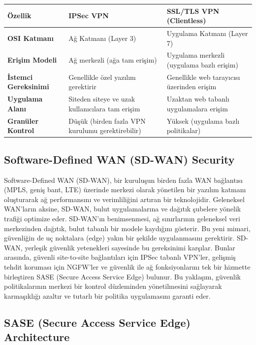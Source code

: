 \begin{tabular}{|p{4cm}|p{6cm}|p{4cm}|}
\hline
\hline
\textbf{Özellik} & \textbf{IPSec VPN} & \textbf{SSL/TLS VPN (Clientless)} \\
\hline
\hline
\textbf{OSI Katmanı} & Ağ Katmanı (Layer 3) & Uygulama Katmanı (Layer 7) \\
\hline
\hline
\textbf{Erişim Modeli} & Ağ merkezli (ağa tam erişim) & Uygulama merkezli (uygulama bazlı erişim) \\
\hline
\hline
\textbf{İstemci Gereksinimi} & Genellikle özel yazılım gerektirir & Genellikle web tarayıcısı üzerinden erişim \\
\hline
\hline
\textbf{Uygulama Alanı} & Siteden siteye ve uzak kullanıcılara tam erişim & Uzaktan web tabanlı uygulamalara erişim \\
\hline
\hline
\textbf{Granüler Kontrol} & Düşük (birden fazla VPN kurulumu gerektirebilir) & Yüksek (uygulama bazlı politikalar) \\
\hline
\hline
\hline
\end{tabular}



\subsection{Software-Defined WAN (SD-WAN) Security}

Software-Defined WAN (SD-WAN), bir kuruluşun birden fazla WAN bağlantısı (MPLS, geniş bant, LTE) üzerinde merkezi olarak yönetilen bir yazılım katmanı oluşturarak ağ performansını ve verimliliğini artıran bir teknolojidir. Geleneksel WAN'ların aksine, SD-WAN, bulut uygulamalarına ve dağıtık şubelere yönelik trafiği optimize eder.
SD-WAN'ın benimsenmesi, ağ sınırlarının geleneksel veri merkezinden dağıtık, bulut tabanlı bir modele kaydığını gösterir. Bu yeni mimari, güvenliğin de uç noktalara (edge) yakın bir şekilde uygulanmasını gerektirir. SD-WAN, yerleşik güvenlik yetenekleri sayesinde bu gereksinimi karşılar. Bunlar arasında, güvenli site-to-site bağlantıları için IPSec tabanlı VPN'ler, gelişmiş tehdit koruması için NGFW'ler ve güvenlik ile ağ fonksiyonlarını tek bir hizmette birleştiren SASE (Secure Access Service Edge) bulunur.
Bu yaklaşım, güvenlik politikalarının merkezi bir kontrol düzleminden yönetilmesini sağlayarak karmaşıklığı azaltır ve tutarlı bir politika uygulamasını garanti eder.

\subsection{SASE (Secure Access Service Edge) Architecture}

